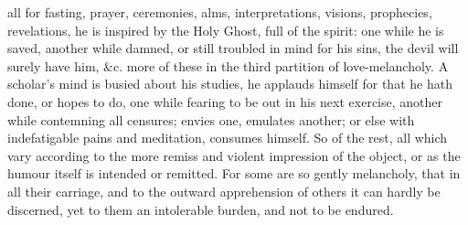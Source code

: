 {all for fasting, prayer, ceremonies, alms, interpretations, visions,
prophecies, revelations,  he is inspired by the Holy Ghost, full
of the spirit: one while he is saved, another while damned, or still
troubled in mind for his sins, the devil will surely have him, \&c. more
of these in the third partition of love-melancholy. A scholar's
mind is busied about his studies, he applauds himself for that he hath
done, or hopes to do, one while fearing to be out in his next exercise,
another while contemning all censures; envies one, emulates another; or
else with indefatigable pains and meditation, consumes himself. So of
the rest, all which vary according to the more remiss and violent
impression of the object, or as the humour itself is intended or
remitted. For some are so gently melancholy, that in all their
carriage, and to the outward apprehension of others it can hardly be
discerned, yet to them an intolerable burden, and not to be endured.

}
